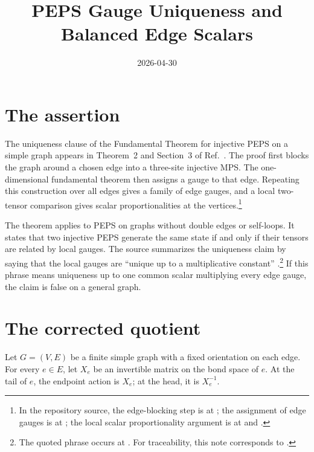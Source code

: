 \documentclass{article}
\title{PEPS Gauge Uniqueness and Balanced Edge Scalars}
\author{}
\date{2026-04-30}
\begin{document}
\maketitle
{}

\section{The assertion}

The uniqueness clause of the Fundamental Theorem for injective PEPS on a
simple graph appears in Theorem~2 and Section~3 of
Ref.~\cite{Molnar2018NormalPEPS}. The proof first blocks the graph around a
chosen edge into a three-site injective MPS. The one-dimensional fundamental
theorem then assigns a gauge to that edge. Repeating this construction over all
edges gives a family of edge gauges, and a local two-tensor comparison gives
scalar proportionalities at the vertices.\footnote{In the repository source,
the edge-blocking step is at
; the assignment of edge
gauges is at ; the local
scalar proportionality argument is at
 and
.}

The theorem applies to PEPS on graphs without double edges or self-loops. It
states that two injective PEPS generate the same state if and only if their
tensors are related by local gauges. The source summarizes the uniqueness
claim by saying that the local gauges are ``unique up to a multiplicative
constant'' \cite{Molnar2018NormalPEPS}.\footnote{The quoted phrase occurs at
. For traceability, this
note corresponds to .}
If this phrase means uniqueness up to one common scalar multiplying every edge
gauge, the claim is false on a general graph.

\section{The corrected quotient}

Let $G=(V,E)$ be a finite simple graph with a fixed orientation on each edge.
For every $e\in E$, let $X_e$ be an invertible matrix on the bond space of
$e$. At the tail of $e$, the endpoint action is $X_e$; at the head, it is
$X_e^{-1}$.
\end{document}
